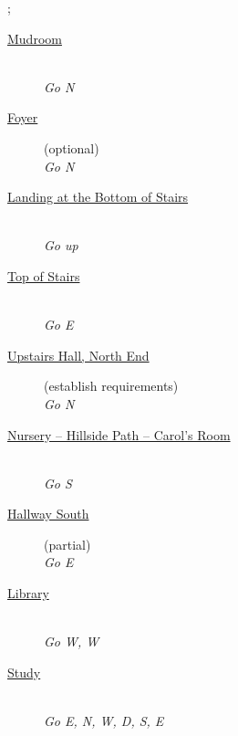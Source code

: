 \documentclass[a5paper]{extarticle}
\begin{document}
\begin{adjustbox}{center}
\sffamily\footnotesize
\begin{gamemap}
;
\end{gamemap}
\end{adjustbox}

\newpage{}\label{sec:route-5}
\begin{description}
\item[{\hyperref[sec:req-Mudroom]{Mudroom}}] ~\\
  \emph{Go N}
\item[{\hyperref[sec:req-Foyer]{Foyer}}] (optional)\\
  \emph{Go N}
\item[{\hyperref[sec:req-Landing-at-the-Bottom-of-Stairs]{Landing at the Bottom of Stairs}}] ~\\
  \emph{Go up}
\item[{\hyperref[sec:req-Top-of-Stairs]{Top of Stairs}}] ~\\
  \emph{Go E}
\item[{\hyperref[sec:req-Upstairs-Hall-N]{Upstairs Hall, North End}}] (establish requirements)\\
  \emph{Go N}
\item[{\hyperref[sec:req-Nursery--Hillside-Path--Carol's-Room]{Nursery -- Hillside Path -- Carol’s Room}}] ~\\
  \emph{Go S}
\item[{\hyperref[sec:req-Hallway-South]{Hallway South}}] (partial)\\
  \emph{Go E}
\item[{\hyperref[sec:req-Library]{Library}}] ~\\
  \emph{Go W, W}
\item[{\hyperref[sec:req-Study]{Study}}] ~\\
  \emph{Go E, N, W, D, S, E}
\end{description}
\end{document}
